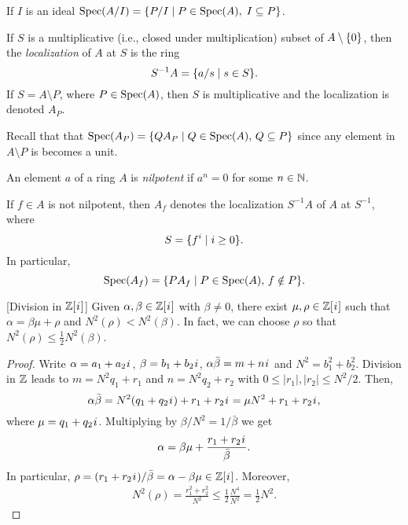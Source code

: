 \begin{rem}
    If $I$ is an ideal $\operatorname{Spec}(A/I)=\{P/I \mid P\in\operatorname{Spec}(A),\; I\subseteq P\}$.
\end{rem}

\begin{defn}
    If $S$ is a multiplicative (i.e., closed under multiplication) subset of $A\setminus\{0\}$, then the \textsl{localization} of $A$ at $S$ is the ring
    $$
        S^{-1}A = \{a/s\mid s\in S\}.
    $$
    If $S=A\setminus P$, where $P\in\operatorname{Spec}(A)$, then $S$ is multiplicative and the localization is denoted $A_P$.
\end{defn}

\begin{rem}
    Recall that that $\operatorname{Spec}(A_P)=\{QA_P\mid Q\in\operatorname{Spec}(A),\, Q\subseteq P\}$ since any element in $A\setminus P$ is becomes a unit.
\end{rem}

\begin{defn}
    An element $a$ of a ring $A$ is \textsl{nilpotent} if $a^n=0$ for some $n\in\mathbb{N}$.
\end{defn}

\begin{ntn}
    If $f\in A$ is not nilpotent, then $A_f$ denotes the localization $S^{-1}A$ of $A$ at $S^{-1}$, where
    $$
        S = \{f^i\mid i\ge0\}.
    $$
    In particular,
    $$
        \operatorname{Spec}(A_f) = \{PA_f\mid P\in\operatorname{Spec}(A),\, f\notin P\}.
    $$
\end{ntn}

\begin{thm} {\rm[Division in $\mathbb{Z}[{\mkern1mu i\mkern1mu}]$]}
    Given\/ $\alpha, \beta \in \mathbb{Z}[{\mkern1mu i\mkern1mu}]$ with\/ $\beta \neq 0$, there exist\/ $\mu, \rho \in \mathbb{Z}[{\mkern1mu i\mkern1mu}]$ such that\/ $\alpha = \beta\mu + \rho$ and\/ $N^2(\rho) < N^2(\beta)$. In fact, we can choose\/ $\rho$ so that\/ $N^2(\rho) \leq \frac{1}{2} N^2(\beta)$.
\end{thm}

\begin{proof}
    Write $\alpha=a_1+a_2{\mkern1mu i\mkern1mu}$, $\beta=b_1+b_2{\mkern1mu i\mkern1mu}$, $\alpha\bar\beta = m+n{\mkern1mu i\mkern1mu}$ and $N^2=b_1^2+b_2^2$.
    Division in $\mathbb{Z}$ leads to $m = N^2q_1 + r_1$ and $n = N^2q_2 + r_2$ with $0\le|r_1|, |r_2|\le N^2/2$. Then,
    $$
        \alpha\bar\beta = N^2(q_1 + q_2{\mkern1mu i\mkern1mu}) + r_1+r_2{\mkern1mu i\mkern1mu}
            = \mu N^2 + r_1+r_2{\mkern1mu i\mkern1mu},
    $$
    where $\mu=q_1+q_2{\mkern1mu i\mkern1mu}$. Multiplying by $\beta/N^2=1/\bar\beta$ we get
    $$
        \alpha = \beta\mu + \frac{r_1+r_2{\mkern1mu i\mkern1mu}}{\bar\beta}.
    $$
    In particular, $\rho=(r_1+r_2{\mkern1mu i\mkern1mu})/\bar\beta=\alpha-\beta\mu\in\mathbb{Z}[{\mkern1mu i\mkern1mu}]$. Moreover,
    \begin{align*}
        N^2(\rho)=\frac{r_1^2+r_2^2}{N^2} \le \frac12\frac{N^4}{N^2}=\frac12N^2.
    \end{align*}
\end{proof}

